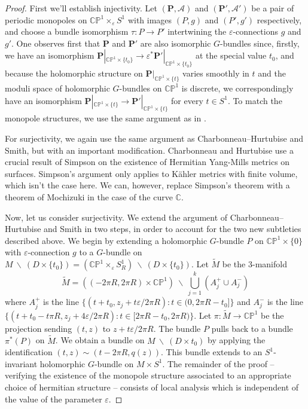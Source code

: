\documentclass[11pt, oneside, reqno]{amsart}
\theoremstyle{definition} \newtheorem{definition}{Definition}[section]
\theoremstyle{definition} \newtheorem{remark}[definition]{Remark}
\theoremstyle{definition} \newtheorem{remarks}[definition]{Remarks}
\theoremstyle{definition} \newtheorem{question}[definition]{Question}
\theoremstyle{definition} \newtheorem*{note}{Note}
\theoremstyle{definition} \newtheorem{example}[definition]{Example}
\theoremstyle{definition} \newtheorem{examples}[definition]{Examples}
\newcommand{\bb}[1]{\mathbb{#1}}
\newcommand{\mc}[1]{\mathcal{#1}}
\newcommand{\wt}[1]{\widetilde{#1}}
\newcommand{\bo}[1]{\boldsymbol{#1}}
\newcommand{\bs}{\ \backslash \ }
\newcommand{\CC}{\mathbb{C}}
\newcommand{\eps}{\varepsilon}
\begin{document}
\begin{proof}
First we'll establish injectivity.  Let $(\bo P, \mc A)$ and $(\bo P', \mc A')$ be a pair of periodic monopoles on $\bb{CP}^1 \times_\eps S^1$ with images $(P,g)$ and $(P', g')$ respectively, and choose a bundle isomorphism $\tau \colon P \to P'$ intertwining the $\eps$-connections $g$ and $g'$.  One observes first that $\bo P$ and $\bo P'$ are also isomorphic $G$-bundles since, firstly, we have an isomorphism $\bo P|_{\bb{CP}^1 \times \{t_0\}} \to \eps^*\bo P'|_{\bb{CP}^1 \times \{t_0\}}$ at the special value $t_0$, and because the holomorphic structure on $\bo P|_{\bb{CP}^1 \times \{t\}}$ varies smoothly in $t$ and the moduli space of holomorphic $G$-bundles on $\bb{CP}^1$ is discrete, we correspondingly have an isomorphism $\bo P|_{\bb{CP}^1 \times \{t\}} \to \bo P'|_{\bb{CP}^1 \times \{t\}}$ for every $t \in S^1$.  To match the monopole structures, we use the same argument as in \cite[Proposition 5.6]{Smith}.

For surjectivity, we again use the same argument as Charbonneau--Hurtubise and Smith, but with an important modification.  Charbonneau and Hurtubise use a crucial result of Simpson \cite[Theorem 1]{Simpson} on the existence of Hermitian Yang-Mills metrics on surfaces.  Simpson's argument only applies to K\"ahler metrics with finite volume, which isn't the case here.  We can, however, replace Simpson's theorem with a theorem of Mochizuki \cite[Corollary 3.13]{MochizukiKH} in the case of the curve $\CC$.

Now, let us consider surjectivity.  We extend the argument of Charbonneau--Hurtubise and Smith in two steps, in order to account for the two new subtleties described above.  We begin by extending a holomorphic $G$-bundle $P$ on $\bb{CP}^1 \times \{0\}$ with $\eps$-connection $g$ to a $G$-bundle on $M \bs (D \times \{t_0\}) = (\bb{CP}^1 \times_\eps S^1_R) \bs (D \times \{t_0\})$.  Let $\wt M$ be the 3-manifold
\[\wt M = ((-2\pi R, 2\pi R) \times \bb{CP}^1) \bs \bigcup_{j=1}^k (A^+_j \cup A^-_j)\]
where $A^+_j$ is the line $\{(t+ t_0,z_j + t \eps/{2\pi R}) \colon t \in (0, 2\pi R - t_0]\}$ and $A^-_j$ is the line $\{(t + t_0 - t \pi R,z_j + 4 \eps/{2\pi R}) \colon t \in [2\pi R-t_0, 2 \pi R)\}$.
Let $\pi \colon \wt M \to \bb{CP}^1$ be the projection sending $(t,z)$ to $z + t\eps/2 \pi R$. The bundle $P$ pulls back to a bundle $\pi^*(P)$ on $\wt M$. We obtain a bundle on $M \bs (D \times t_0)$ by applying the identification $(t,z) \sim (t - 2 \pi R, q(z))$. This bundle extends to an $S^1$-invariant holomorphic $G$-bundle on $M \times S^1$. The remainder of the proof -- verifying the existence of the monopole structure associated to an appropriate choice of hermitian structure -- consists of local analysis which is independent of the value of the parameter $\eps$. 


\end{proof}
\end{document}
